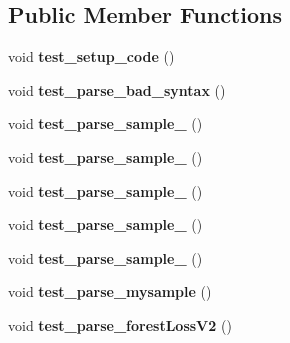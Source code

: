 \subsection*{Public Member Functions}
\begin{DoxyCompactItemize}
\item 
\hypertarget{class_parser_test_suite_ab7eff3217b5e28c9003f27c51da107ac}{}void {\bfseries test\+\_\+setup\+\_\+code} ()\label{class_parser_test_suite_ab7eff3217b5e28c9003f27c51da107ac}

\item 
\hypertarget{class_parser_test_suite_ac4a829a66a1582bee38e90ac3f0355f4}{}void {\bfseries test\+\_\+parse\+\_\+bad\+\_\+syntax} ()\label{class_parser_test_suite_ac4a829a66a1582bee38e90ac3f0355f4}

\item 
\hypertarget{class_parser_test_suite_a26eed485bc2671f4ac256ef97a21b704}{}void {\bfseries test\+\_\+parse\+\_\+sample\+\_} ()\label{class_parser_test_suite_a26eed485bc2671f4ac256ef97a21b704}

\item 
\hypertarget{class_parser_test_suite_a0f1d6af1e07e35541fb83416d5e3e229}{}void {\bfseries test\+\_\+parse\+\_\+sample\+\_} ()\label{class_parser_test_suite_a0f1d6af1e07e35541fb83416d5e3e229}

\item 
\hypertarget{class_parser_test_suite_aecc132f6b6dbb2e5bba08baec64f3f65}{}void {\bfseries test\+\_\+parse\+\_\+sample\+\_} ()\label{class_parser_test_suite_aecc132f6b6dbb2e5bba08baec64f3f65}

\item 
\hypertarget{class_parser_test_suite_a6e5dfaf7b8ddc98001a4fec39b3f0a79}{}void {\bfseries test\+\_\+parse\+\_\+sample\+\_} ()\label{class_parser_test_suite_a6e5dfaf7b8ddc98001a4fec39b3f0a79}

\item 
\hypertarget{class_parser_test_suite_a5b9a3cf2b76271244baaaaa4c8b7f7d5}{}void {\bfseries test\+\_\+parse\+\_\+sample\+\_} ()\label{class_parser_test_suite_a5b9a3cf2b76271244baaaaa4c8b7f7d5}

\item 
\hypertarget{class_parser_test_suite_ae59d0f6d92f8d83833d51ef01479fdeb}{}void {\bfseries test\+\_\+parse\+\_\+mysample} ()\label{class_parser_test_suite_ae59d0f6d92f8d83833d51ef01479fdeb}

\item 
\hypertarget{class_parser_test_suite_a379db1a22b2c32defb8395b9b2166f76}{}void {\bfseries test\+\_\+parse\+\_\+forest\+Loss\+V2} ()\label{class_parser_test_suite_a379db1a22b2c32defb8395b9b2166f76}

\end{DoxyCompactItemize}
